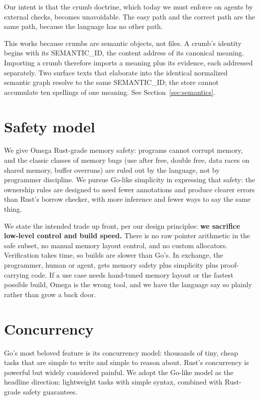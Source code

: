 \documentclass[11pt]{article}
\begin{document}
Our intent is that the crumb doctrine, which today we must enforce on
agents by external checks, becomes unavoidable. The easy path and the
correct path are the same path, because the language has no other path.

This works because crumbs are semantic objects, not files. A crumb's
identity begins with its SEMANTIC\_ID, the content address of its canonical
meaning. Importing a crumb therefore imports a meaning plus its evidence,
each addressed separately. Two surface texts that elaborate into the
identical normalized semantic graph resolve to the same SEMANTIC\_ID; the
store cannot accumulate ten spellings of one meaning. See
Section~\ref{sec:semantics}.

\section{Safety model}
\label{sec:safety}

We give Omega Rust-grade memory safety: programs cannot corrupt memory,
and the classic classes of memory bugs (use after free, double free, data
races on shared memory, buffer overruns) are ruled out by the language, not
by programmer discipline. We pursue Go-like simplicity in expressing that
safety: the ownership rules are designed to need fewer annotations and
produce clearer errors than Rust's borrow checker, with more inference and
fewer ways to say the same thing.

We state the intended trade up front, per our design principles:
\textbf{we sacrifice low-level control and build speed.} There is no
raw pointer arithmetic in the safe subset, no manual memory layout control,
and no custom allocators. Verification takes time, so builds are slower than
Go's. In exchange, the programmer, human or agent, gets memory safety plus
simplicity plus proof-carrying code. If a use case needs hand-tuned memory
layout or the fastest possible build, Omega is the wrong tool, and we have
the language say so plainly rather than grow a back door.

\section{Concurrency}

Go's most beloved feature is its concurrency model: thousands of tiny,
cheap tasks that are simple to write and simple to reason about. Rust's
concurrency is powerful but widely considered painful. We adopt the
Go-like model as the headline direction: lightweight tasks with simple
syntax, combined with Rust-grade safety guarantees.
\end{document}
